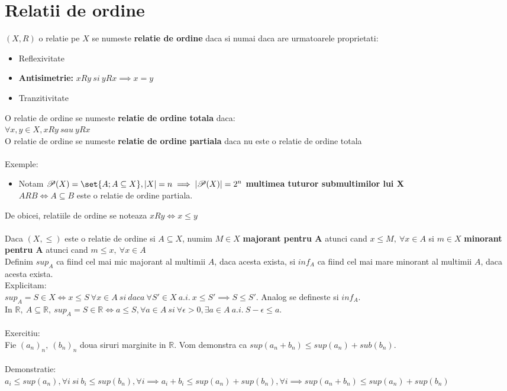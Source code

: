 \documentclass{article}
\begin{document}
    \section{Relatii de ordine}
        $(X,R)$ o relatie pe $X$ se numeste \textbf{relatie de ordine} daca si numai daca are urmatoarele proprietati:
        \begin{itemize}
            \item Reflexivitate
            \item \textbf{Antisimetrie:} $xRy\ si\ yRx \implies x=y$
            \item Tranzitivitate
        \end{itemize}
        O relatie de ordine se numeste \textbf{relatie de ordine totala} daca:\\ $\forall x,y \in X, xRy\ sau\ yRx$ \\
        O relatie de ordine se numeste \textbf{relatie de ordine partiala} daca nu este o relatie de ordine totala\\ \\
        Exemple:
        \begin{itemize}
            \item Notam $\mathscr{P}(X) = \set{A;A\subseteq X}, |X| = n \implies |\mathscr{P}(X)| = 2^n$ \textbf{multimea tuturor submultimilor lui X}\\
            $ARB \iff A \subseteq B$ este o relatie de ordine partiala.
        \end{itemize}
        De obicei, relatiile de ordine se noteaza $xRy \iff x \leq y$\\ \\
        Daca $(X,\leq)$ este o relatie de ordine si $A \subseteq X$, numim $M\in X$ \textbf{majorant pentru A} atunci cand $x \leq M,\ \forall x \in A$ si $m\in
        X$ \textbf{minorant pentru A} atunci cand $m \leq x,\ \forall x \in A$\\
        Definim $sup_A$ ca fiind cel mai mic majorant al multimii $A$, daca acesta exista, si $inf_A$ ca fiind cel mai mare minorant al multimii $A$, daca acesta exista.\\
        Explicitam:\\
        $sup_A = S \in X \iff x \leq S\ \forall x \in A\ si\ daca\ \forall S' \in X\ a.i.\ x \leq S' \implies S \leq S'$. Analog se defineste si $inf_A$.\\
        In $\mathbb{R},\ A \subseteq \mathbb{R},\ sup_A = S \in \mathbb{R} \iff a \leq S, \forall a \in A\ si\ \forall \epsilon > 0, \exists a \in A\ a.i.\
        S-\epsilon \leq a$.\\ \\
        Exercitiu:\\
        Fie $(a_n)_n,\ (b_n)_n$ doua siruri marginite in $\mathbb{R}$. Vom demonstra ca $sup(a_n+b_n) \leq sup(a_n) + sub(b_n)$.\\ \\
        Demonstratie:\\
        $a_i \leq sup(a_n),\forall i\ si\ b_i \leq sup(b_n),\forall i \implies a_i+b_i \leq sup(a_n) + sup(b_n),\forall i \implies sup(a_n+b_n) \leq sup(a_n) +
        sup(b_n)$
\end{document}

